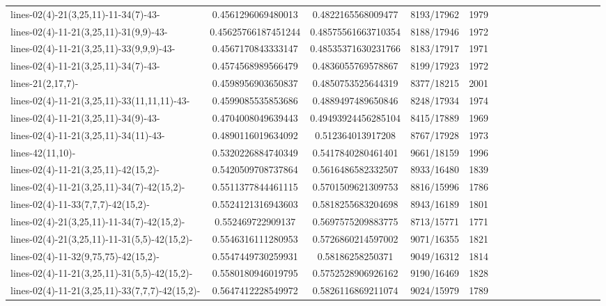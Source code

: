 \documentclass[12pt]{report}			%
\begin{document}
\begin{landscape}
\begin{longtable}{ | p{5cm} | *{15}{c|}}
lines-02(4)-21(3,25,11)-11-34(7)-43-              & 0.4561296069480013  & 0.4822165568009477  & 8193/17962  & 1979 \\
lines-02(4)-11-21(3,25,11)-31(9,9)-43-            & 0.45625766187451244 & 0.48575561663710354 & 8188/17946  & 1972 \\
lines-02(4)-11-21(3,25,11)-33(9,9,9)-43-          & 0.4567170843333147  & 0.48535371630231766 & 8183/17917  & 1971 \\
lines-02(4)-11-21(3,25,11)-34(7)-43-              & 0.4574568989566479  & 0.4836055769578867  & 8199/17923  & 1972 \\
lines-21(2,17,7)-                                 & 0.4598956903650837  & 0.4850753525644319  & 8377/18215  & 2001 \\
lines-02(4)-11-21(3,25,11)-33(11,11,11)-43-        & 0.4599085535853686  & 0.4889497489650846  & 8248/17934  & 1974 \\
lines-02(4)-11-21(3,25,11)-34(9)-43-              & 0.4704008049639443  & 0.49493924456285104 & 8415/17889  & 1969 \\
lines-02(4)-11-21(3,25,11)-34(11)-43-             & 0.4890116019634092  & 0.512364013917208   & 8767/17928  & 1973 \\
lines-42(11,10)-                                  & 0.5320226884740349  & 0.5417840280461401  & 9661/18159  & 1996 \\
lines-02(4)-11-21(3,25,11)-42(15,2)-              & 0.5420509708737864  & 0.5616486582332507  & 8933/16480  & 1839 \\
lines-02(4)-11-21(3,25,11)-34(7)-42(15,2)-        & 0.5511377844461115  & 0.5701509621309753  & 8816/15996  & 1786 \\
lines-02(4)-11-33(7,7,7)-42(15,2)-               & 0.5524121316943603  & 0.5818255683204698  & 8943/16189  & 1801 \\
lines-02(4)-21(3,25,11)-11-34(7)-42(15,2)-        & 0.552469722909137   & 0.5697575209883775  & 8713/15771  & 1771 \\
lines-02(4)-21(3,25,11)-11-31(5,5)-42(15,2)-      & 0.5546316111280953  & 0.5726860214597002  & 9071/16355  & 1821 \\
lines-02(4)-11-32(9,75,75)-42(15,2)-              & 0.5547449730259931  & 0.58186258250371    & 9049/16312  & 1814 \\
lines-02(4)-11-21(3,25,11)-31(5,5)-42(15,2)-      & 0.5580180946019795  & 0.5752528906926162  & 9190/16469  & 1828 \\
lines-02(4)-11-21(3,25,11)-33(7,7,7)-42(15,2)-   & 0.5647412228549972  & 0.5826116869211074  & 9024/15979  & 1789 \\

\end{longtable}
\end{landscape}
\end{document}
